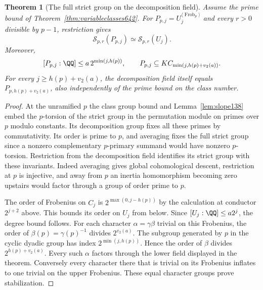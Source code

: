 \documentclass[a4paper,11pt]{article}
\newtheorem{theorem}[proposition]{Theorem}
\theoremstyle{definition}
\theoremstyle{remark}
\numberwithin{equation}{section}
\begin{document}
\begin{theorem}[The full strict group on the decomposition field]
\leavevmode\label{thm:variabledescent642}
Assume the prime bound of Theorem~\ref{thm:variableclasses642}.
For \(P_{p,j}=U_j^{\langle\operatorname{Frob}_p\rangle}\) and
every \(r>0\) divisible by \(p-1\), restriction gives
\[
      \mathcal S_{p,r}(P_{p,j})\simeq\mathcal S_{p,r}(U_j).
\]
Moreover,
\[
   [P_{p,j}:\QQ]\le a\,2^{\min(j,h(p))},\qquad
   P_{p,j}\subseteq K C_{\min(j,h(p)+v_2(a))}.
\]
For every \(j\ge h(p)+v_2(a)\), the decomposition field itself
equals \(P_{p,h(p)+v_2(a)}\), also independently of the prime
bound on the class number.
\end{theorem}
\begin{proof}
At the unramified \(p\) the class group bound and
Lemma~\ref{lem:slope138} embed the \(p\)-torsion of the strict
group in the permutation module on primes over \(p\) modulo
constants. Its decomposition group fixes all these primes by
commutativity. Its order is prime to \(p\), and averaging
fixes the full strict group since a nonzero complementary
\(p\)-primary summand would have nonzero \(p\)-torsion.
Restriction from the decomposition field identifies its strict
group with these invariants. Indeed averaging gives global
cohomological descent, restriction at \(p\) is injective, and
away from \(p\) an inertia homomorphism becoming zero upstairs
would factor through a group of order prime to \(p\).

The order of Frobenius on \(C_j\) is
\(2^{\max(0,j-h(p))}\) by the calculation at conductor
\(2^{j+2}\) above. This bounds its order on \(U_j\) from below.
Since \([U_j:\QQ]\le a2^j\), the degree bound follows.
For each character \(\alpha=\gamma\beta\) trivial on this
Frobenius, the order of \(\beta(p)=\gamma(p)^{-1}\) divides
\(2^{v_2(a)}\). The subgroup generated by \(p\) in the
cyclic dyadic group has index \(2^{\min(j,h(p))}\). Hence
the order of \(\beta\) divides \(2^{h(p)+v_2(a)}\).
Every such \(\alpha\) factors through the lower field displayed
in the theorem. Conversely every character there that is
trivial on its Frobenius inflates to one trivial on the upper
Frobenius. These equal character groups prove stabilization.
\end{proof}
\end{document}
